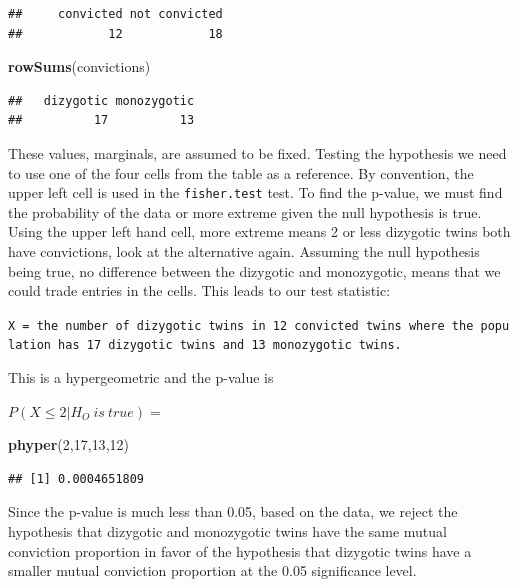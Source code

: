 \documentclass[]{book}
\newenvironment{Shaded}{\begin{snugshade}}{\end{snugshade}}
\newcommand{\KeywordTok}[1]{\textcolor[rgb]{0.13,0.29,0.53}{\textbf{#1}}}
\newcommand{\DecValTok}[1]{\textcolor[rgb]{0.00,0.00,0.81}{#1}}
\newcommand{\NormalTok}[1]{#1}
\theoremstyle{definition}
\theoremstyle{definition}
\theoremstyle{definition}
\theoremstyle{remark}
\begin{document}
\begin{verbatim}
##     convicted not convicted 
##            12            18
\end{verbatim}

\begin{Shaded}
\begin{Highlighting}[]
\KeywordTok{rowSums}\NormalTok{(convictions)}
\end{Highlighting}
\end{Shaded}

\begin{verbatim}
##   dizygotic monozygotic 
##          17          13
\end{verbatim}

These values, marginals, are assumed to be fixed. Testing the hypothesis
we need to use one of the four cells from the table as a reference. By
convention, the upper left cell is used in the \texttt{fisher.test}
test. To find the p-value, we must find the probability of the data or
more extreme given the null hypothesis is true. Using the upper left
hand cell, more extreme means 2 or less dizygotic twins both have
convictions, look at the alternative again. Assuming the null hypothesis
being true, no difference between the dizygotic and monozygotic, means
that we could trade entries in the cells. This leads to our test
statistic:

\texttt{X\ =\ the\ number\ of\ dizygotic\ twins\ in\ 12\ convicted\ twins\ where\ the\ population\ has\ 17\ dizygotic\ twins\ and\ 13\ monozygotic\ twins.}

This is a hypergeometric and the p-value is

\(P(X \leq 2|H_{O} \: is \: true) =\)

\begin{Shaded}
\begin{Highlighting}[]
\KeywordTok{phyper}\NormalTok{(}\DecValTok{2}\NormalTok{,}\DecValTok{17}\NormalTok{,}\DecValTok{13}\NormalTok{,}\DecValTok{12}\NormalTok{)}
\end{Highlighting}
\end{Shaded}

\begin{verbatim}
## [1] 0.0004651809
\end{verbatim}

Since the p-value is much less than 0.05, based on the data, we reject
the hypothesis that dizygotic and monozygotic twins have the same mutual
conviction proportion in favor of the hypothesis that dizygotic twins
have a smaller mutual conviction proportion at the 0.05 significance
level.
\end{document}
